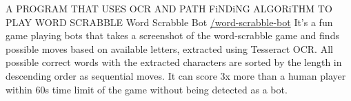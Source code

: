 \cventry
    {A PROGRAM THAT USES OCR AND PATH FiNDiNG ALGORiTHM TO PLAY WORD SCRABBLE} %
    {Word Scrabble Bot} %
    {\href{https://github.com/mehedi-shafi/word-scrabble-bot}{\faGithubSquare/word-scrabble-bot}} %
    {} %
    {
      It’s a fun game playing bots that takes a screenshot of the word‑scrabble game and finds possible moves based on available letters, extracted using Tesseract OCR. All possible correct words with the extracted characters are sorted by the length in descending order as sequential moves. It can score 3x more than a human player within 60s time limit of the game without being detected as a bot.
    }